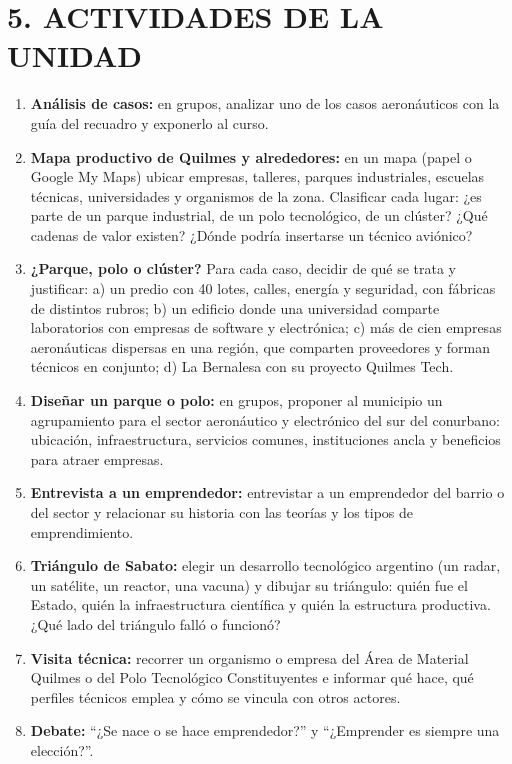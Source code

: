 \section*{5. ACTIVIDADES DE LA UNIDAD}

\begin{enumerate}
  \item \textbf{Análisis de casos:} en grupos, analizar uno de los casos aeronáuticos con la
        guía del recuadro y exponerlo al curso.
  \item \textbf{Mapa productivo de Quilmes y alrededores:} en un mapa (papel o Google My
        Maps) ubicar empresas, talleres, parques industriales, escuelas técnicas,
        universidades y organismos de la zona. Clasificar cada lugar: ¿es parte de un parque
        industrial, de un polo tecnológico, de un clúster? ¿Qué cadenas de valor existen?
        ¿Dónde podría insertarse un técnico aviónico?
  \item \textbf{¿Parque, polo o clúster?} Para cada caso, decidir de qué se trata y
        justificar: a) un predio con 40 lotes, calles, energía y seguridad, con fábricas de
        distintos rubros; b) un edificio donde una universidad comparte laboratorios con
        empresas de software y electrónica; c) más de cien empresas aeronáuticas dispersas en
        una región, que comparten proveedores y forman técnicos en conjunto; d) La Bernalesa
        con su proyecto Quilmes Tech.
  \item \textbf{Diseñar un parque o polo:} en grupos, proponer al municipio un agrupamiento
        para el sector aeronáutico y electrónico del sur del conurbano: ubicación,
        infraestructura, servicios comunes, instituciones ancla y beneficios para atraer
        empresas.
  \item \textbf{Entrevista a un emprendedor:} entrevistar a un emprendedor del barrio o del
        sector y relacionar su historia con las teorías y los tipos de emprendimiento.
  \item \textbf{Triángulo de Sabato:} elegir un desarrollo tecnológico argentino (un radar,
        un satélite, un reactor, una vacuna) y dibujar su triángulo: quién fue el Estado, quién
        la infraestructura científica y quién la estructura productiva. ¿Qué lado del triángulo
        falló o funcionó?
  \item \textbf{Visita técnica:} recorrer un organismo o empresa del Área de Material Quilmes o
        del Polo Tecnológico Constituyentes e informar qué hace, qué perfiles técnicos emplea y
        cómo se vincula con otros actores.
  \item \textbf{Debate:} ``¿Se nace o se hace emprendedor?'' y ``¿Emprender es siempre una
        elección?''.
\end{enumerate}
